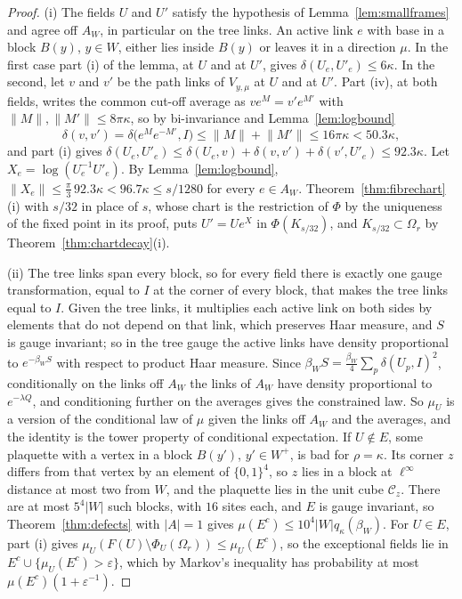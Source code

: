 \documentclass[11pt]{amsart}
\theoremstyle{definition}
\theoremstyle{remark}
\numberwithin{equation}{section}
\begin{document}
\begin{proof}
(i) The fields $U$ and $U'$ satisfy the hypothesis of
Lemma~\ref{lem:smallframes} and agree off $A_W$, in particular on the tree
links. An active link $e$ with base in a block $B(y)$, $y\in W$, either lies
inside $B(y)$ or leaves it in a direction $\mu$. In the first case part (i)
of the lemma, at $U$ and at $U'$, gives $\delta(U_e,U'_e)\le6\kappa$. In the
second, let $v$ and $v'$ be the path links of $V_{y,\mu}$ at $U$ and at
$U'$. Part (iv), at both fields, writes the common cut-off average as $v
e^M=v'e^{M'}$ with $\lVert M\rVert,\lVert M'\rVert\le8\pi\kappa$, so by
bi-invariance and Lemma~\ref{lem:logbound}
\[
\delta(v,v')=\delta\bigl(e^Me^{-M'},I\bigr)\le\lVert M\rVert+\lVert M'
\rVert\le16\pi\kappa<50.3\kappa,
\]
and part (i) gives $\delta(U_e,U'_e)\le\delta(U_e,v)+\delta(v,v')+\delta(
v',U'_e)\le92.3\kappa$. Let $X_e=\log(U_e^{-1}U'_e)$. By
Lemma~\ref{lem:logbound}, $\lVert X_e\rVert\le\frac\pi3\,92.3\kappa<96.7
\kappa\le s/1280$ for every $e\in A_W$. Theorem~\ref{thm:fibrechart}(i)
with $s/32$ in place of $s$, whose chart is the restriction of $\Phi$ by
the uniqueness of the fixed point in its proof, puts $U'=Ue^X$ in $\Phi(K
_{s/32})$, and $K_{s/32}\subset\Omega_r$ by
Theorem~\ref{thm:chartdecay}(i).

(ii) The tree links span every block, so for every field there is exactly
one gauge transformation, equal to $I$ at the corner of every block, that
makes the tree links equal to $I$. Given the tree links, it multiplies each
active link on both sides by elements that do not depend on that link,
which preserves Haar measure, and $S$ is gauge invariant; so in the tree
gauge the active links have density proportional to $e^{-\beta_WS}$ with
respect to product Haar measure. Since $\beta_WS=\frac{\beta_W}4\sum_p
\delta(U_p,I)^2$, conditionally on the links off $A_W$ the links of $A_W$
have density proportional to $e^{-\lambda Q}$, and conditioning further on
the averages gives the constrained law. So $\mu_U$ is a version of the
conditional law of $\mu$ given the links off $A_W$ and the averages, and
the identity is the tower property of conditional expectation. If $U\notin
E$, some plaquette with a vertex in a block $B(y')$, $y'\in W^+$, is bad for
$\rho=\kappa$. Its corner $z$ differs from that vertex by an element of
$\{0,1\}^4$, so $z$ lies in a block at $\ell^\infty$ distance at most two
from $W$, and the plaquette lies in the unit cube $\mathcal C_z$. There are
at most $5^4\lvert W\rvert$ such blocks, with $16$ sites each, and $E$ is
gauge invariant, so Theorem~\ref{thm:defects} with $\lvert A\rvert=1$ gives
$\mu(E^c)\le10^4\lvert W\rvert q_\kappa(\beta_W)$. For $U\in E$, part (i)
gives $\mu_U(F(U)\setminus\Phi_U(\Omega_r))\le\mu_U(E^c)$, so the
exceptional fields lie in $E^c\cup\{\mu_U(E^c)>\varepsilon\}$, which by
Markov's inequality has probability at most $\mu(E^c)(1+\varepsilon^{-1})$.


\end{proof}
\end{document}
